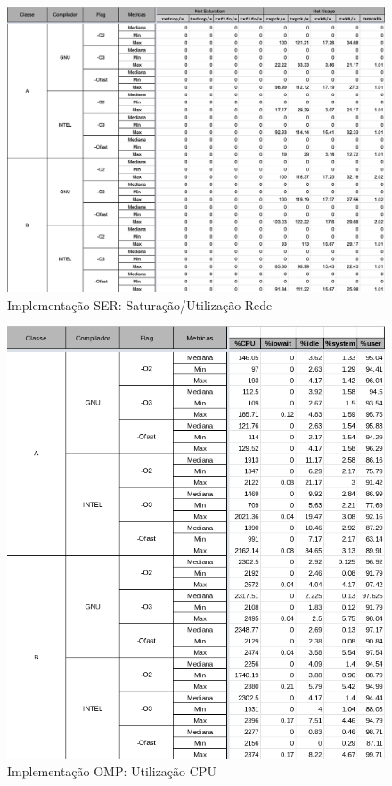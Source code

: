 \documentclass{article}
\begin{document}
\begin{appendices}
\begin{figure}[H]
    \centering
    \includegraphics[width=12cm]{Pictures/LUMZ_r431_SER_NET.png}
    \caption{Implementação SER: Saturação/Utilização Rede}
    \label{figure:LUMZ_r431_SER_NT}
\end{figure}

\begin{figure}[H]
    \centering
    \includegraphics[width=12cm]{Pictures/LUMZ_r431_OMP_CPU.png}
    \caption{Implementação OMP: Utilização CPU}
    \label{figure:LUMZ_r431_OMP_CPU}
\end{figure}


\end{appendices}
\end{document}
